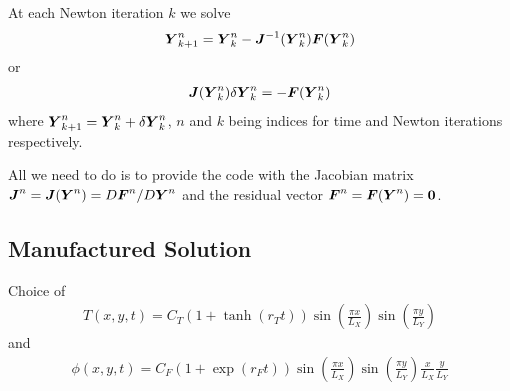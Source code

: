 At each Newton iteration $k$ we solve
\begin{align}
  \boldsymbol{Y}_{k+1}^{n} = \boldsymbol{Y}_{k}^{n} 
  - \boldsymbol{J}^{-1}(\boldsymbol{Y}_{k}^{n}) \boldsymbol{F}(\boldsymbol{Y}_{k}^{n})
\end{align}
or
\begin{align}
  \boldsymbol{J}(\boldsymbol{Y}_{k}^{n}) \delta\boldsymbol{Y}_{k}^{n} = - \boldsymbol{F}(\boldsymbol{Y}_{k}^{n}) \label{newton}
\end{align}
where $\boldsymbol{Y}_{k+1}^{n} = \boldsymbol{Y}_{k}^{n} + \delta\boldsymbol{Y}_{k}^{n}$, $n$ and $k$ being indices for time and Newton iterations respectively.

All we need to do is to provide the code with the Jacobian matrix $\boldsymbol{J}^{n}=\boldsymbol{J}(\boldsymbol{Y}^{n})=D\boldsymbol{F}^{n}/D\boldsymbol{Y}^{n}$
and the residual vector $\boldsymbol{F}^{n}=\boldsymbol{F}(\boldsymbol{Y}^n)=\boldsymbol{0}$.

\subsection*{Manufactured Solution}
Choice of
\begin{align}
  T(x,y,t) = 
  C_T \left(1+\tanh(r_T t)\right)
  \sin\left(\frac{\pi x}{L_X}\right)
  \sin\left(\frac{\pi y}{L_Y}\right)
\end{align}
and
\begin{align}
  \phi(x,y,t) = 
  C_F \left(1+\exp(r_F t)\right)
  \sin\left(\frac{\pi x}{L_X}\right)
  \sin\left(\frac{\pi y}{L_Y}\right)
  \frac{x}{L_X}
  \frac{y}{L_Y}
\end{align}

